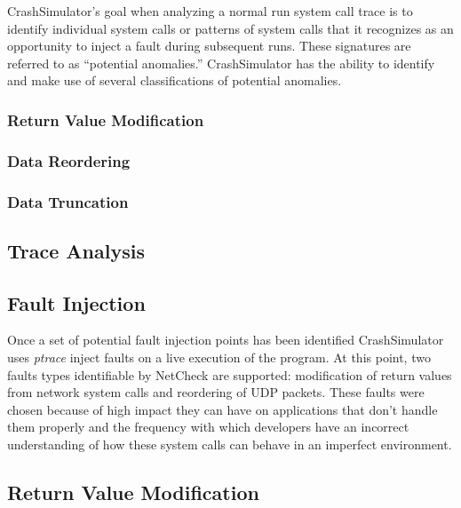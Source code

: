         CrashSimulator's goal when analyzing a normal run system call trace is to identify individual system calls or
        patterns of system calls that it recognizes as an opportunity to inject a fault during subsequent runs. These
        signatures are referred to as ``potential anomalies.'' CrashSimulator has the ability to identify and make use
        of several classifications of potential anomalies.

        \subsubsection{Return Value Modification}

        \subsubsection{Data Reordering}

        \subsubsection{Data Truncation}

    \subsection{Trace Analysis}



    \subsection{Fault Injection}

         Once a set of potential fault injection points has been identified CrashSimulator uses \emph{ptrace} inject
         faults on a live execution of the program. At this point, two faults types identifiable by NetCheck are
         supported: modification of return values from network system calls and reordering of UDP packets.  These faults
         were chosen because of high impact they can have on applications that don't handle them properly and the
         frequency with which developers have an incorrect understanding of how these system calls can behave in an
         imperfect environment.

        \subsection{Return Value Modification}

